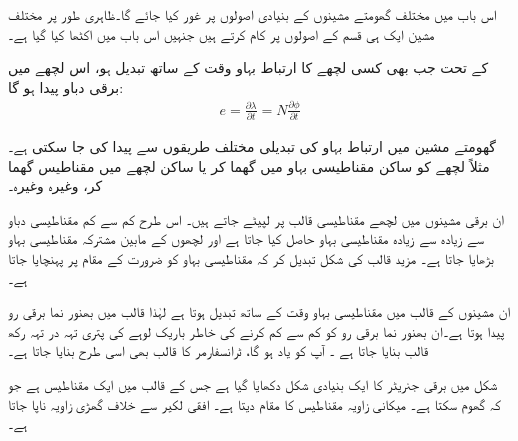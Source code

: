 اس باب میں مختلف گھومتے مشینوں کے بنیادی اصولوں پر غور کیا جائے گا۔ظاہری طور پر مختلف مشین ایک ہی قسم کے اصولوں پر کام کرتے ہیں جنہیں اس باب میں اکٹھا کیا گیا ہے۔

 کے تحت جب بھی کسی لچھے کا ارتباط بہاو   وقت کے ساتھ تبدیل ہو، اس لچھے میں برقی دباو پیدا ہو گا:
\begin{align}
e=\frac{\partial \lambda}{\partial t}=N \frac{\partial \phi}{\partial t}
\end{align}

گھومتے مشین میں ارتباط بہاو کی تبدیلی مختلف طریقوں سے پیدا کی جا سکتی ہے۔مثلاً  لچھے کو ساکن مقناطیسی بہاو میں گھما کر یا  ساکن لچھے میں مقناطیس گھما کر، وغیرہ وغیرہ۔

ان برقی مشینوں میں لچھے مقناطیسی قالب  پر لپیٹے جاتے ہیں۔ اس طرح کم سے کم مقناطیسی دباو سے زیادہ سے زیادہ مقناطیسی بہاو حاصل کیا جاتا ہے اور لچھوں کے مابین مشترکہ مقناطیسی بہاو بڑھایا جاتا ہے۔ مزید قالب کی شکل تبدیل کر کہ مقناطیسی بہاو کو ضرورت کے مقام پر پہنچایا جاتا ہے۔

ان مشینوں کے قالب میں مقناطیسی بہاو وقت کے ساتھ تبدیل ہوتا ہے لہٰذا قالب میں بھنور نما برقی رو پیدا ہوتا ہے۔ان بھنور نما برقی رو کو کم سے کم کرنے کی خاطر  باریک لوہے کی پتری تہہ در تہہ رکھ قالب بنایا جاتا ہے ۔  آپ کو یاد ہو گا، ٹرانسفارمر کا قالب بھی اسی طرح بنایا جاتا ہے۔

شکل   میں  برقی جنریٹر کا ایک بنیادی شکل دکھایا گیا ہے جس کے قالب میں ایک مقناطیس ہے جو کہ گھوم سکتا ہے۔   میکانی زاویہ  مقناطیس کا مقام دیتا ہے۔ افقی لکیر سے خلاف گھڑی  زاویہ  ناپا جاتا ہے۔

